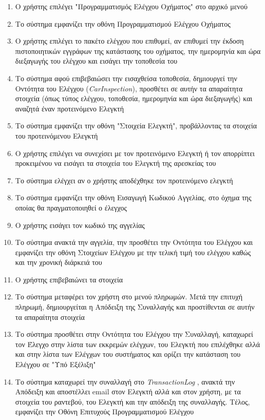 \documentclass{../ol-softwaremanual}
\begin{document}
	\begin{enumerate}
		\item Ο χρήστης επιλέγει \en"\gr Προγραμματισμός Ελέγχου Οχήματος\en" \gr στο αρχικό μενού
		\item Το σύστημα εμφανίζει την οθόνη Προγραμματισμού Ελέγχου Οχήματος
		\item Ο χρήστης επιλέγει το πακέτο ελέγχου που επιθυμεί, αν επιθυμεί την έκδοση πιστοποιητικών εγγράφων της κατάστασης του οχήματος, την ημερομηνία και ώρα διεξαγωγής του ελέγχου και εισάγει την τοποθεσία του
		\item Το σύστημα αφού επιβεβαιώσει την εισαχθείσα τοποθεσία, δημιουργεί την Οντότητα του Ελέγχου (\en \textit{CarInspection}\gr), προσθέτει σε αυτήν τα απαραίτητα στοιχεία (όπως τύπος ελέγχου, τοποθεσία, ημερομηνία και ώρα διεξαγωγής) και αναζητά έναν προτεινόμενο Ελεγκτή
		\item Το σύστημα εμφανίζει την οθόνη \en"\gr Στοιχεία Ελεγκτή\en"\gr, προβάλλοντας τα στοιχεία του προτεινόμενου Ελεγκτή		
		\item Ο χρήστης επιλέγει να συνεχίσει με τον προτεινόμενο Ελεγκτή ή τον απορρίπτει προκειμένου να εισάγει τα στοιχεία του Ελεγκτή της αρεσκείας του
		\item Το σύστημα ελέγχει αν ο χρήστης αποδέχθηκε τον προτεινόμενο ελεγκτή
		\item Το σύστημα εμφανίζει την οθόνη Εισαγωγή Κωδικού Αγγελίας, στο όχημα της οποίας θα πραγματοποιηθεί ο έλεγχος		
		\item Ο χρήστης εισάγει τον κωδικό της αγγελίας
		\item Το σύστημα ανακτά την αγγελία, την προσθέτει την Οντότητα του Ελέγχου και εμφανίζει την οθόνη Στοιχείων Ελέγχου με την τελική τιμή του ελέγχου καθώς και την χρονική διάρκειά του
		\item Ο χρήστης επιβεβαιώνει τα στοιχεία
		\item Το σύστημα μεταφέρει τον χρήστη στο μενού πληρωμών. Μετά την επιτυχή πληρωμή, δημιουργείται η Απόδειξη της Συναλλαγής και προστίθενται σε αυτήν τα απαραίτητα στοιχεία
		\item Το σύστημα προσθέτει στην Οντότητα του Ελέγχου την Συναλλαγή, καταχωρεί τον Έλεγχο στην λίστα των εκκρεμών ελέγχων, του Ελεγκτή που επιλέχθηκε αλλά και στην λίστα των Ελέγχων του συστήματος και ορίζει την κατάσταση του Ελέγχου σε \en"\gr Υπό Εξέλιξη\en"\gr
		\item Το σύστημα καταχωρεί την συναλλαγή στο \en \textit{TransactionLog} \gr, ανακτά την Απόδειξη και αποστέλλει \en email \gr στον Ελεγκτή αλλά και στον χρήστη, με τα στοιχεία του ραντεβού, του Ελεγκτή και την απόδειξη της συναλλαγής. Τέλος, εμφανίζει την Οθόνη Επιτυχούς Προγραμματισμού Ελέγχου		
	\end{enumerate}
	
\end{document}
